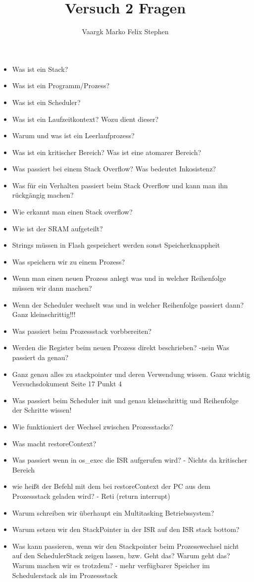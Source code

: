 \documentclass[12pt]{article}
\title{Versuch 2 Fragen}
\author{Vaargk Marko Felix Stephen}
\begin{document}
\maketitle

\begin{itemize}
\item Was ist ein Stack?
\item Was ist ein Programm/Prozess?
\item Was ist ein Scheduler?
\item Was ist ein Laufzeitkontext? Wozu dient dieser?
\item Warum und was ist ein Leerlaufprozess?
\item Was ist ein kritischer Bereich? Was ist eine atomarer Bereich?
\item Was passiert bei einem Stack Overflow? Was bedeutet Inkosistenz?
\item Was für ein Verhalten passiert beim Stack Overflow und kann man ihn rückgängig machen?
\item Wie erkannt man einen Stack overflow?
\item Wie ist der SRAM aufgeteilt?
\item Strings müssen in Flash gespeichert werden sonst Speicherknappheit
\item Was speichern wir zu einem Prozess?
\item Wenn man einen neuen Prozess anlegt was und in welcher Reihenfolge müssen wir dann machen?
\item Wenn der Scheduler wechselt was und in welcher Reihenfolge passiert dann? Ganz kleinschrittig!!!
\item Was passiert beim Prozessstack vorbbereiten?
\item Werden die Register beim neuen Prozess direkt beschrieben? -nein Was passiert da genau?
\item Ganz genau alles zu stackpointer und deren Verwendung wissen. Ganz wichtig Versuchsdokument Seite 17 Punkt 4
\item Was passiert beim Scheduler init und genau kleinschrittig und Reihenfolge der Schritte wissen!
\item Wie funktioniert der Wechsel zwischen Prozesstacks?
\item Was macht restoreContext?
\item Was passiert wenn in os\_exec die ISR aufgerufen wird? - Nichts da kritischer Bereich
\item wie heißt der Befehl mit dem bei restoreContext der PC aus dem Prozessstack geladen wird? - Reti (return interrupt)
\item Warum schreiben wir überhaupt ein Multitasking Betriebssystem?
\item Warum setzen wir den StackPointer in der ISR auf den ISR stack bottom?
\item Was kann passieren, wenn wir den Stackpointer beim Prozesswechsel nicht auf den SchedulerStack zeigen lassen, bzw. Geht das? Warum geht das? Warum machen wir es trotzdem? - mehr verfügbarer Speicher im Schedulerstack als im Prozessstack
\end{itemize}
\end{document}
